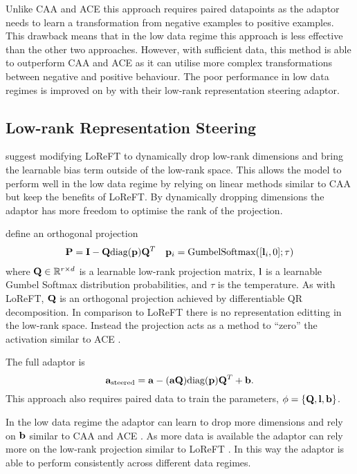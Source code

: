 Unlike CAA \cite{caa} and ACE \cite{ace} this approach requires paired datapoints as the adaptor needs to learn a transformation from negative examples to positive examples.
This drawback means that in the low data regime this approach is less effective than the other two approaches.
However, with sufficient data, this method is able to outperform CAA and ACE as it can utilise more complex transformations between negative and positive behaviour.
The poor performance in low data regimes is improved on by \citet{steering-clear} with their low-rank representation steering adaptor.

\subsection{Low-rank Representation Steering}
\label{lorest}

\citet{steering-clear} suggest modifying LoReFT \cite{reft} to dynamically drop low-rank dimensions and bring the learnable bias term outside of the low-rank space.
This allows the model to perform well in the low data regime by relying on linear methods similar to CAA \cite{caa} but keep the benefits of LoReFT.
By dynamically dropping dimensions the adaptor has more freedom to optimise the rank of the projection.

\citet{steering-clear} define an orthogonal projection
\begin{align*}
    \mathbf{P} = \mathbf{I} - \mathbf{Q}\text{diag}(\mathbf{p})\mathbf{Q}^T && \mathbf{p}_i = \text{GumbelSoftmax}([\mathbf{l}_i,0];\tau)
\end{align*}
where $\mathbf{Q} \in \mathbb{R}^{r\times d}$ is a learnable low-rank projection matrix, $\mathbf{l}$ is a learnable Gumbel Softmax distribution probabilities, and $\tau$ is the temperature.
As with LoReFT, $\mathbf{Q}$ is an orthogonal projection achieved by differentiable QR decomposition.
In comparison to LoReFT  there is no representation editting in the low-rank space.
Instead the projection acts as a method to ``zero'' the activation similar to ACE \cite{ace}.

The full adaptor is
\begin{equation}
    \mathbf{a}_\text{steered} = \mathbf{a} - (\mathbf{a}\mathbf{Q})\text{diag}(\mathbf{p})\mathbf{Q}^T + \mathbf{b}.
\end{equation}
This approach also requires paired data to train the parameters, $\phi = \{\mathbf{Q}, \mathbf{l}, \mathbf{b}\}$.

In the low data regime the adaptor can learn to drop more dimensions and rely on $\mathbf{b}$ similar to CAA \cite{caa} and ACE \cite{ace}.
As more data is available the adaptor can rely more on the low-rank projection similar to LoReFT \cite{reft}.
In this way the adaptor is able to perform consistently across different data regimes.

